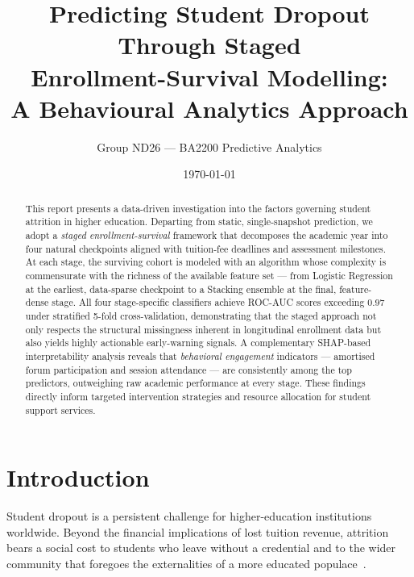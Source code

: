 \documentclass[8pt,twocolumn]{extarticle}
\title{\textbf{Predicting Student Dropout Through Staged\\Enrollment-Survival Modelling:\\A Behavioural Analytics Approach}}
\author{Group ND26 --- BA2200 Predictive Analytics}
\date{\today}
\begin{document}
\maketitle

\begin{abstract}
This report presents a data-driven investigation into the factors governing student attrition in higher education.
Departing from static, single-snapshot prediction, we adopt a \emph{staged enrollment-survival} framework that decomposes
the academic year into four natural checkpoints aligned with tuition-fee deadlines and assessment milestones.
At each stage, the surviving cohort is modeled with an algorithm whose complexity is commensurate with the
richness of the available feature set --- from Logistic Regression at the earliest, data-sparse checkpoint
to a Stacking ensemble at the final, feature-dense stage.
All four stage-specific classifiers achieve ROC-AUC scores exceeding $0.97$ under stratified 5-fold cross-validation,
demonstrating that the staged approach not only respects the structural missingness inherent in longitudinal
enrollment data but also yields highly actionable early-warning signals.
A complementary SHAP-based interpretability analysis reveals that \emph{behavioral engagement} indicators
--- amortised forum participation and session attendance --- are consistently among the top predictors,
outweighing raw academic performance at every stage.
These findings directly inform targeted intervention strategies and resource allocation for student support services.
\end{abstract}

\section{Introduction}\label{sec:introduction}

Student dropout is a persistent challenge for higher-education institutions worldwide.
Beyond the financial implications of lost tuition revenue, attrition bears a social cost
to students who leave without a credential and to the wider community that foregoes
the externalities of a more educated populace~\cite{tinto1993leaving}.
\end{document}
